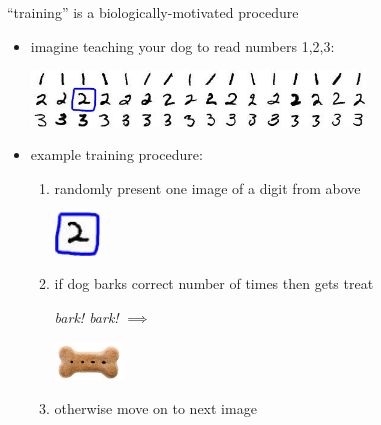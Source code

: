 \documentclass[xcolor={svgnames},
               hyperref={colorlinks,citecolor=DeepPink4,linkcolor=FireBrick,urlcolor=Maroon}]
               {beamer}
\begin{document}
\begin{frame}{``training'' is a biologically-motivated procedure}

\begin{itemize}
\item imagine teaching your dog to read numbers 1,2,3:
\begin{center}
\includegraphics[width=0.7\textwidth]{figs/onetwothree}
\end{center}
\item example training procedure:
    \begin{enumerate}
    \item randomly present one image of a digit from above
\begin{center}
\includegraphics[width=0.1\textwidth]{figs/two} \phantom{dlasbj sadkf adsk}
\end{center}
    \item if dog barks correct number of times then gets treat

\vspace{5mm}
\hspace{10mm} \emph{bark! bark!} \qquad $\implies$

\vspace{-6mm}
\hfill \includegraphics[width=0.15\textwidth]{figs/dogtreat} \hspace{25mm} \phantom{boo}
    \item otherwise move on to next image
    \end{enumerate}
\end{itemize}
\end{frame}
\end{document}
